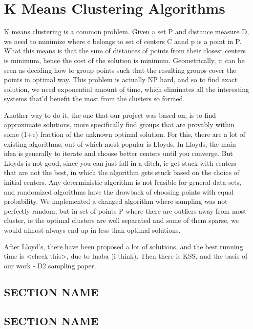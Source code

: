 \chapter{K Means Clustering Algorithms}
K means clustering is a common problem. Given a set P and distance measure D, we need to minimize  where c belongs to set of centers C aand p is a point in P. What this means is that the sum of distances of points from their closest centers is minimum, hence the cost of the solution is minimum. Geometrically, it can be seen as deciding how to group points such that the resulting groups cover the points in optimal way. This problem is actually NP hard, and so to find exact solution, we need exponential amount of time, which eliminates all the interesting systems that'd benefit the most from the clusters so formed.

Another way to do it, the one that our project was based on, is to find approximate solutions, more specifically find groups that are provably within some (1+e) fraction of the unknown optimal solution. For this, there are a lot of existing algorithms, out of which most popular is Lloyds. In Lloyds, the main idea is generally to iterate and choose better centers until you converge. But Lloyds is not good, since you can just fall in a ditch, ie get stuck with centers that are not the best, in which the algorithm gets stuck based on the choice of initial centers. Any deterministic algorithm is not feasible for general data sets, and randomized algorithms have the drawback of choosing points with equal probability. We implemented a changed algorithm where sampling was not perfectly random, but in set of points P where there are outliers away from most cluster, ie the optimal clusters are well separated and some of them sparse, we would almost always end up in less than optimal solutions.

After Lloyd's, there have been proposed a lot of solutions, and the best running time is <check this>, due to Inaba (i think). Then there is KSS, and the basis of our work - D2 sampling paper.

\section{SECTION NAME}
\lipsum[2]

\section{SECTION NAME}
\lipsum[3]

